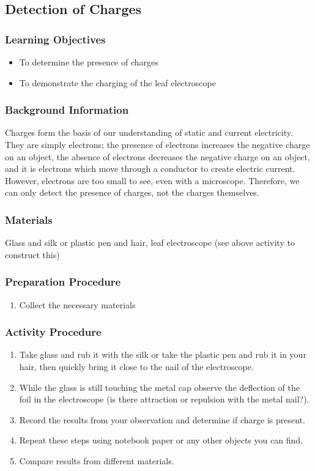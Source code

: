 \subsection{Detection of Charges}

\subsubsection*{Learning Objectives}
\begin{itemize}
\item{To determine the presence of charges} 
\item{To demonstrate the charging of the leaf electroscope} 
\end{itemize}

\subsubsection*{Background Information}
Charges form the basis of our understanding of static and current electricity. They are simply electrons; the presence of electrons increases the negative charge on an object, the absence of electrons decreases the negative charge on an object, and it is electrons which move through a conductor to create electric current. However, electrons are too small to see, even with a microscope. Therefore, we can only detect the presence of charges, not the charges themselves.

\subsubsection*{Materials}
Glass and silk or plastic pen and hair, leaf electroscope (see above activity to construct this)

\subsubsection*{Preparation Procedure}
\begin{enumerate}
\item{Collect the necessary materials}
\end{enumerate}

\subsubsection*{Activity Procedure}
\begin{enumerate}
\item{Take glass and rub it with the silk or take the plastic pen and rub it in your hair, then quickly bring it close to the nail of the electroscope.}
\item{While the glass is still touching the metal cap observe the deflection of the foil in the electroscope  (is there attraction or repulsion with the metal nail?).} 
\item{Record the results from your observation and determine if charge is present.} 
\item{Repeat these steps using notebook paper or any other objects you can find.} 
\item{Compare results from different materials.}
\end{enumerate}

